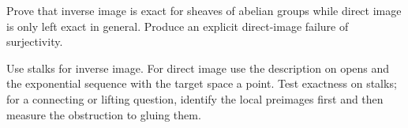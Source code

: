\begin{problem}\label{chal:vi16-04}
Prove that inverse image is exact for sheaves of abelian groups while direct image is only left exact in general.  Produce an explicit direct-image failure of surjectivity.
\end{problem}
\begin{hint}
Use stalks for inverse image.  For direct image use the description on opens and the exponential sequence with the target space a point. Test exactness on stalks; for a connecting or lifting question, identify the local preimages first and then measure the obstruction to gluing them.
\end{hint}
